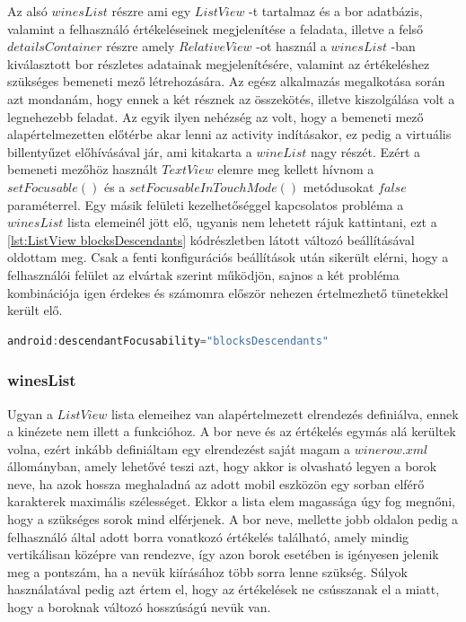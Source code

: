 \documentclass[12pt]{report}
\theoremstyle{definition}
\begin{document}
	Az alsó $winesList$ részre ami egy $ListView$ -t tartalmaz és a bor adatbázis, valamint a felhasználó értékeléseinek megjelenítése a feladata, illetve a felső $detailsContainer$ részre amely $RelativeView$ -ot használ a $winesList$ -ban kiválasztott bor részletes adatainak megjelenítésére, valamint az értékeléshez szükséges bemeneti mező létrehozására. Az egész alkalmazás megalkotása során azt mondanám, hogy ennek a két résznek az összekötés, illetve kiszolgálása volt a legnehezebb feladat. Az egyik ilyen nehézség az volt, hogy a bemeneti mező alapértelmezetten előtérbe akar lenni az activity indításakor, ez pedig a virtuális billentyűzet előhívásával jár, ami kitakarta a $wineList$ nagy részét. Ezért a bemeneti mezőhöz használt $TextView$ elemre meg kellett hívnom a $setFocusable\left(\right)$ és a $setFocusableInTouchMode\left(\right)$ metódusokat $false$ paraméterrel. Egy másik felületi kezelhetőséggel kapcsolatos probléma a $winesList$ lista elemeinél jött elő, ugyanis nem lehetett rájuk kattintani, ezt a \ref{lst:ListView blocksDescendants} kódrészletben látott változó beállításával oldottam meg. Csak a fenti konfigurációs beállítások után sikerült elérni, hogy a felhasználói felület az elvártak szerint működjön, sajnos a két probléma kombinációja igen érdekes és számomra először nehezen értelmezhető tünetekkel került elő.
	
	\noindent\begin{minipage}{\linewidth}
		\begin{lstlisting}[language=java,label={lst:ListView blocksDescendants}, caption={A $ListView$ elmeinek előtérbehozhatóságnak beállítása}]
android:descendantFocusability="blocksDescendants" 
		\end{lstlisting}
	\end{minipage}
	
	\subsubsection{winesList}
	Ugyan a $ListView$ lista elemeihez van alapértelmezett elrendezés definiálva, ennek a kinézete nem illett a funkcióhoz. A bor neve és az értékelés egymás alá kerültek volna, ezért inkább definiáltam egy elrendezést saját magam a $winerow.xml$ állományban, amely lehetővé teszi azt, hogy akkor is olvasható legyen a borok neve, ha azok hossza meghaladná az adott mobil eszközön egy sorban elférő karakterek maximális szélességet. Ekkor a lista elem magassága úgy fog megnőni, hogy a szükséges sorok mind elférjenek. A bor neve, mellette jobb oldalon pedig a felhasználó által adott borra vonatkozó értékelés található, amely mindig vertikálisan középre van rendezve, így azon borok esetében is igényesen jelenik meg a pontszám, ha a nevük kiírásához több sorra lenne szükség. Súlyok használatával pedig azt értem el, hogy az értékelések ne csússzanak el a miatt, hogy a boroknak változó hosszúságú nevük van.
	
\end{document}
